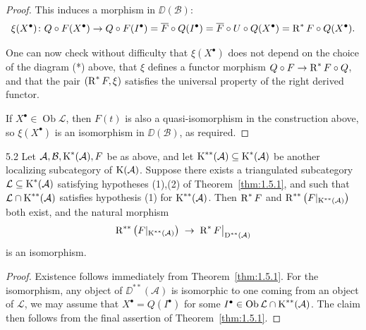 \begin{proof}
This induces a morphism in $\DD(\mathcal{B})$:
\[
\xi(X^\bullet)\colon Q\circ F(X^\bullet)
\to Q\circ F(I^\bullet)
= \overline{F}\circ Q(I^\bullet)
= \overline{F}\circ U\circ Q(X^\bullet)
= \operatorname{R}^*F\circ Q(X^\bullet).
\]

One can now check without difficulty that $\xi(X^\bullet)$  does not depend on
the choice of the diagram (*) above, that $\xi$ defines a functor morphism $Q\circ F\to \operatorname{R}^*F\circ Q$, and that the pair $(\operatorname{R}^*F,\xi)$ satisfies the universal property of the right derived functor.

If $X^\bullet\in\operatorname{Ob}\mathcal{L}$, then $F(t)$ is also a quasi-isomorphism in the construction above, so $\xi(X^\bullet)$ is an isomorphism in $\DD(\mathcal{B})$, as required.
\end{proof}

\begin{bookproposition}{5.2}\label{prop:1.5.2}
Let $\mathcal{A},\mathcal{B},\operatorname{K}^*(\mathcal{A}),F$ be as above, and let $\operatorname{K}^{**}(\mathcal{A})\subseteq\operatorname{K}^*(\mathcal{A})$ be another localizing subcategory of $\operatorname{K}(\mathcal{A})$. Suppose there exists a triangulated subcategory $\mathcal{L}\subseteq\operatorname{K}^*(\mathcal{A})$ satisfying hypotheses (1),(2) of Theorem~\ref{thm:1.5.1}, and such that $\mathcal{L}\cap\operatorname{K}^{**}(\mathcal{A})$ satisfies hypothesis (1) for $\operatorname{K}^{**}(\mathcal{A})$.
Then  $\operatorname{R}^*F$ and $\operatorname{R}^{**}\big(F|_{\operatorname{K}^{**}(\mathcal{A})}\big)$ both exist, and the natural morphism
\[
\operatorname{R}^{**}\big(F|_{\operatorname{K}^{**}(\mathcal{A})}\big)
\;\to\;
\operatorname{R}^*F\big|_{\operatorname{D}^{**}(\mathcal{A})}
\]
is an isomorphism.
\end{bookproposition}

\begin{proof}
Existence follows immediately from Theorem~\ref{thm:1.5.1}. For the isomorphism, any object of $\DD^{**}(\mathcal{A})$ is isomorphic to one coming from an object of $\mathcal{L}$, we may assume that $X^\bullet=Q(I^\bullet)$ for some $I^\bullet\in\operatorname{Ob} \mathcal{L}\cap\operatorname{K}^{**}(\mathcal{A})$. The claim then follows from the final assertion of Theorem~\ref{thm:1.5.1}.
\end{proof}

